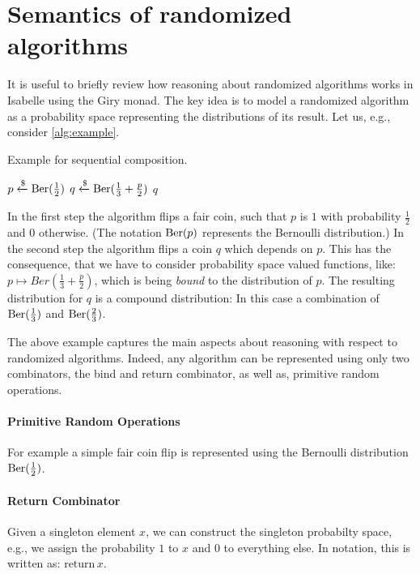 \section{Semantics of randomized algorithms}
It is useful to briefly review how reasoning about randomized algorithms works in Isabelle using the Giry monad.
The key idea is to model a randomized algorithm as a probability space representing the distributions of its result.
Let us, e.g., consider \cref{alg:example}.
\begin{algorithm}[h!]
\caption{Example for sequential composition.}\label{alg:example}
\begin{algorithmic}[1]
\State $p \xleftarrow{\$} \operatorname{\mathrm{Ber}}(\frac{1}{2})$
\State $q \xleftarrow{\$} \operatorname{\mathrm{Ber}}(\frac{1}{3}+\frac{p}{2})$
\State \Return $q$
\end{algorithmic}
\end{algorithm}%

In the first step the algorithm flips a fair coin, such that $p$ is $1$ with probability $\frac{1}{2}$ and $0$ otherwise. (The notation $\operatorname{\mathrm{Ber}}(p)$ represents the Bernoulli distribution.)
In the second step the algorithm flips a coin $q$ which depends on $p$.
This has the consequence, that we have to consider probability space valued functions, like: $p \mapsto Ber(\frac{1}{3}+\frac{p}{2})$, which is being \emph{bound} to the distribution of $p$.
The resulting distribution for $q$ is a compound distribution: In this case a combination of $\operatorname{\mathrm{Ber}}(\frac{1}{3})$ and $\operatorname{\mathrm{Ber}}(\frac{2}{3})$.

The above example captures the main aspects about reasoning with respect to randomized algorithms.
Indeed, any algorithm can be represented using only two combinators, the bind and return combinator, as well as, primitive random operations.

\paragraph*{Primitive Random Operations}
For example a simple fair coin flip is represented using the Bernoulli distribution $\operatorname{\mathrm{Ber}}(\frac{1}{2})$.

\paragraph*{Return Combinator}
Given a singleton element $x$, we can construct the singleton probabilty space, e.g., we assign the probability $1$ to $x$ and $0$ to everything else.
In notation, this is written as: $\mathrm{return}\, x$. 

